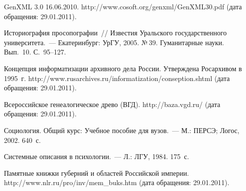 \begin{multicols}{2}
{{\begin{thebibliography}{99}
GenXML 3.0 16.06.2010. {\sf http://www.cosoft.org/\linebreak genxml/GenXML30.pdf} (дата 
обращения: 29.01.2011).

Историография просопографии~// Известия Уральского государственного университета.~--- 
Екатеринбург: УрГУ, 2005. №\,39. Гуманитарные науки. Вып.~10. С.~95--127.

Концепция информатизации архивного дела России. Утверждена Росархивом в 1995~г. {\sf 
http://\linebreak www.rusarchives.ru/informatization/conseption.shtml} (дата обращения: 29.01.2011).

Всероссийское генеалогическое древо (ВГД). {\sf http://baza.vgd.ru/} (дата обращения: 
29.01.2011).

Социология. Общий курс: Учебное пособие для вузов.~--- М.: ПЕРСЭ; Логос, 2002. 640~с.

Системные описания в психологии.~--- Л.: ЛГУ, 1984.  175~с.

\label{end\stat}

Памятные книжки губерний и областей Российской империи. {\sf 
http://www.nlr.ru/pro/inv/mem\_buks.htm} (дата обращения: 29.01.2011).
 \end{thebibliography}
}
}


\end{multicols}